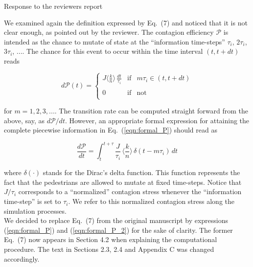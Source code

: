 \documentclass[a4paper,12pt]{letter}
\begin{document}
\begin{letter}{Response to the reviewers report}
{We examined again the definition expressed by Eq.~(7) and noticed that it is 
not clear enough, as pointed out by the reviewer. The contagion efficiency 
$\mathcal{P}$ is intended as the chance to mutate of state at the ``information 
time-steps'' $\tau_i$, $2\tau_i$, $3\tau_i$, ....  The chance for this event to 
occur within the time interval $(t,t+dt)$ reads 


\begin{equation}
 d\mathcal{P}(t)=\left\{\begin{array}{ccl}
                    
J\displaystyle\bigg\langle\frac{k}{n}\bigg\rangle\,
\displaystyle\frac{dt}{\tau_i} &
\mathrm{if} & m\tau_i\in (t,t+dt) \\
                    & & \\
                    0  & \mathrm{if} & \mathrm{not}  \\
                    \end{array}\right.\label{eqn:formal_P}
\end{equation}

for $m=1,2,3,...$. The transition rate can be computed straight forward from 
the above, say, as $d\mathcal{P}/dt$.  However, an appropriate formal 
expression for attaining the complete piecewise information in 
Eq.~(\ref{eqn:formal_P}) should read as

\begin{equation} 
\displaystyle\frac{d\mathcal{P}}{dt}
=\displaystyle\int_t^{t+\tau}
\displaystyle\frac{J}{\tau_i}\,
\displaystyle\bigg\langle\frac{k}{n}\bigg\rangle \,
\delta(t-m\tau_i)\,dt\label{eqn:formal_P_2}
\end{equation}

where $\delta(\cdot)$ stands for the Dirac's delta function. This function 
represents the fact that the pedestrians are allowed to mutate at fixed 
time-steps.  Notice that $J/\tau_i$ corresponds to a ``normalized'' contagion 
stress whenever the ``information time-step'' is set to $\tau_i$. We refer to 
this normalized contagion stress along the simulation processes.  \\

We decided to replace Eq.~(7) from the original manuscript by expressions 
(\ref{eqn:formal_P}) and (\ref{eqn:formal_P_2}) for the sake of clarity. The 
former Eq.~(7) now appears in Section 4.2 when explaining the computational 
procedure. The text in Sections 2.3, 2.4 and Appendix C was changed accordingly. 
\\
\fi

}
\end{letter}
\end{document}
